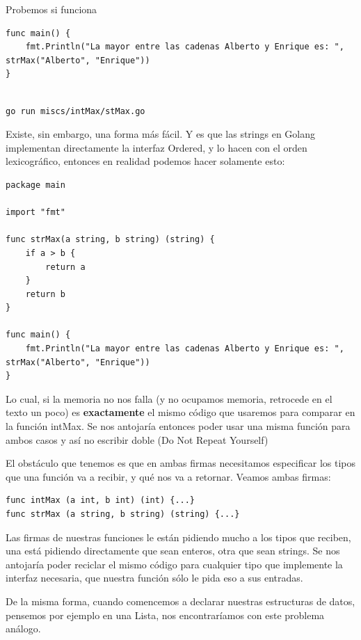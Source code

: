 \documentclass[11pt]{article}
\begin{document}
Probemos si funciona
\begin{verbatim}
func main() {
	fmt.Println("La mayor entre las cadenas Alberto y Enrique es: ", strMax("Alberto", "Enrique"))
}
\end{verbatim}

\begin{verbatim}

go run miscs/intMax/stMax.go

\end{verbatim}

Existe, sin embargo, una forma más fácil. Y es que las strings en Golang implementan directamente la interfaz Ordered, y lo hacen con el orden lexicográfico, entonces en realidad podemos hacer solamente esto:

\begin{verbatim}
package main

import "fmt"

func strMax(a string, b string) (string) {
	if a > b {
		return a
	}
	return b
}

func main() {
	fmt.Println("La mayor entre las cadenas Alberto y Enrique es: ", strMax("Alberto", "Enrique"))
}
\end{verbatim}

Lo cual, si la memoria no nos falla (y no ocupamos memoria, retrocede en el texto un poco) es \textbf{\textbf{exactamente}} el mismo código que usaremos para comparar en la función intMax. Se nos antojaría entonces poder usar una misma función para ambos casos y así no escribir doble (Do Not Repeat Yourself)

El obstáculo que tenemos es que en ambas firmas necesitamos especificar los tipos que una función va a recibir, y qué nos va a retornar.
Veamos ambas firmas:

\begin{verbatim}
func intMax (a int, b int) (int) {...}
func strMax (a string, b string) (string) {...}
\end{verbatim}

Las firmas de nuestras funciones le están pidiendo mucho a los tipos que reciben, una está pidiendo directamente que sean enteros, otra que sean strings. Se nos antojaría poder reciclar el mismo código para cualquier tipo que implemente la interfaz necesaria, que nuestra función sólo le pida eso a sus entradas.

De la misma forma, cuando comencemos a declarar nuestras estructuras de datos, pensemos por ejemplo en una Lista, nos encontraríamos con este problema análogo.
\end{document}
